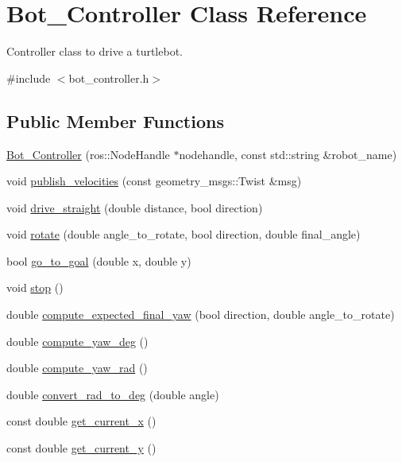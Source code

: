 \hypertarget{class_bot___controller}{}\section{Bot\+\_\+\+Controller Class Reference}
\label{class_bot___controller}


Controller class to drive a turtlebot.  




{\ttfamily \#include $<$bot\+\_\+controller.\+h$>$}

\subsection*{Public Member Functions}
\begin{DoxyCompactItemize}
\item 
\hyperlink{class_bot___controller_a05104e1b41f7c9cd9cdfe80bbbd53a7d}{Bot\+\_\+\+Controller} (ros\+::\+Node\+Handle $\ast$nodehandle, const std\+::string \&robot\+\_\+name)
\item 
void \hyperlink{class_bot___controller_a7c4af8b19d122f72582b5bbd309ded7a}{publish\+\_\+velocities} (const geometry\+\_\+msgs\+::\+Twist \&msg)
\item 
void \hyperlink{class_bot___controller_aacde4d9a862dfa0fc029686a66603de7}{drive\+\_\+straight} (double distance, bool direction)
\item 
void \hyperlink{class_bot___controller_a8ea05eaf643a647581a0f60ab9c85c24}{rotate} (double angle\+\_\+to\+\_\+rotate, bool direction, double final\+\_\+angle)
\item 
bool \hyperlink{class_bot___controller_a7bd188779f02159f9fdfea435caf94b1}{go\+\_\+to\+\_\+goal} (double x, double y)
\item 
void \hyperlink{class_bot___controller_a87e3ac792f943a573e676d382a816519}{stop} ()
\item 
double \hyperlink{class_bot___controller_a25e004b632ad2c2c494f8a91f3c24533}{compute\+\_\+expected\+\_\+final\+\_\+yaw} (bool direction, double angle\+\_\+to\+\_\+rotate)
\item 
double \hyperlink{class_bot___controller_ad9ed858063dc3f928157122e95e677ae}{compute\+\_\+yaw\+\_\+deg} ()
\item 
double \hyperlink{class_bot___controller_af23e3dd2a3af58bc16fda4aebbd78c18}{compute\+\_\+yaw\+\_\+rad} ()
\item 
double \hyperlink{class_bot___controller_ad07d6cfa7f66b200a1540221b699b48e}{convert\+\_\+rad\+\_\+to\+\_\+deg} (double angle)
\item 
const double \hyperlink{class_bot___controller_a2efd33efbb2d3c8caa52e04a049b5971}{get\+\_\+current\+\_\+x} ()
\item 
const double \hyperlink{class_bot___controller_a5985b03ff6787846a5abf5cd85ed6ae2}{get\+\_\+current\+\_\+y} ()
\end{DoxyCompactItemize}



